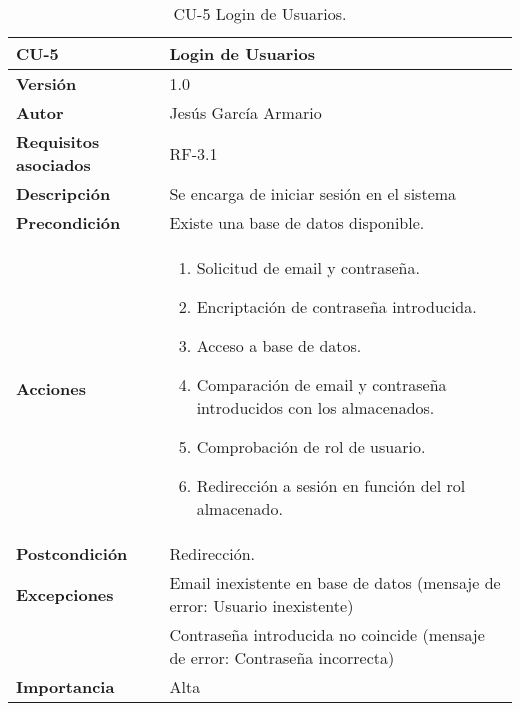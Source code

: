 \begin{table}[p]
	\centering
	\begin{tabularx}{\linewidth}{ p{} p{} }
		\toprule
		\textbf{CU-5}    & {Login de Usuarios}\\
		\toprule
		\textbf{Versión}              & 1.0    \\
		\textbf{Autor}                & Jesús García Armario \\
		\textbf{Requisitos asociados} & RF-3.1 \\
		\textbf{Descripción}          & Se encarga de iniciar sesión en el sistema \\
		\textbf{Precondición}         & Existe una base de datos disponible. \\
		\textbf{Acciones}             &
		\begin{enumerate}
			\def\labelenumi{\arabic{enumi}.}
			\tightlist
			\item Solicitud de email y contraseña.
   \item Encriptación de contraseña introducida.
   \item Acceso a base de datos.
   \item Comparación de email y contraseña introducidos con los almacenados.
   \item Comprobación de rol de usuario.
   \item Redirección a sesión en función del rol almacenado.
\end{enumerate}\\
		\textbf{Postcondición}        &  Redirección.\\
		\textbf{Excepciones}          & Email inexistente en base de datos (mensaje de error: Usuario inexistente)\\
  & Contraseña introducida no coincide (mensaje de error: Contraseña incorrecta)\\
		\textbf{Importancia}          & Alta \\
		\bottomrule
	\end{tabularx}
	\caption{CU-5 Login de Usuarios.}
 \end{table}


